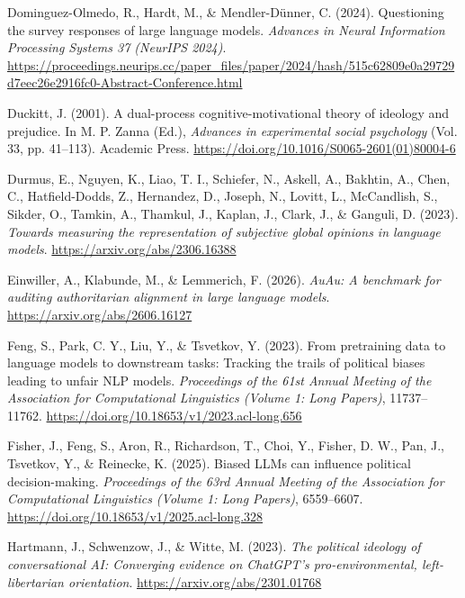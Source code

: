 \documentclass[
]{article}
\newlength{\cslhangindent}
\newenvironment{CSLReferences}[2] %
 {\begin{list}{}{%
  \setlength{\itemindent}{0pt}
  \setlength{\leftmargin}{0pt}
  \setlength{\parsep}{0pt}
  \ifodd #1
   \setlength{\leftmargin}{\cslhangindent}
   \setlength{\itemindent}{-1\cslhangindent}
  \fi
  \setlength{\itemsep}{#2\baselineskip}}}
 {\end{list}}
\begin{document}
\begin{CSLReferences}{1}{0}
Dominguez-Olmedo, R., Hardt, M., \& Mendler-Dünner, C. (2024).
Questioning the survey responses of large language models.
\emph{Advances in Neural Information Processing Systems 37 (NeurIPS
2024)}.
\url{https://proceedings.neurips.cc/paper_files/paper/2024/hash/515c62809e0a29729d7eec26e2916fc0-Abstract-Conference.html}

Duckitt, J. (2001). A dual-process cognitive-motivational theory of
ideology and prejudice. In M. P. Zanna (Ed.), \emph{Advances in
experimental social psychology} (Vol. 33, pp. 41--113). Academic Press.
\url{https://doi.org/10.1016/S0065-2601(01)80004-6}

Durmus, E., Nguyen, K., Liao, T. I., Schiefer, N., Askell, A., Bakhtin,
A., Chen, C., Hatfield-Dodds, Z., Hernandez, D., Joseph, N., Lovitt, L.,
McCandlish, S., Sikder, O., Tamkin, A., Thamkul, J., Kaplan, J., Clark,
J., \& Ganguli, D. (2023). \emph{Towards measuring the representation of
subjective global opinions in language models}.
\url{https://arxiv.org/abs/2306.16388}

Einwiller, A., Klabunde, M., \& Lemmerich, F. (2026). \emph{{AuAu}: A
benchmark for auditing authoritarian alignment in large language
models}. \url{https://arxiv.org/abs/2606.16127}

Feng, S., Park, C. Y., Liu, Y., \& Tsvetkov, Y. (2023). From pretraining
data to language models to downstream tasks: Tracking the trails of
political biases leading to unfair {NLP} models. \emph{Proceedings of
the 61st Annual Meeting of the Association for Computational Linguistics
(Volume 1: Long Papers)}, 11737--11762.
\url{https://doi.org/10.18653/v1/2023.acl-long.656}

Fisher, J., Feng, S., Aron, R., Richardson, T., Choi, Y., Fisher, D. W.,
Pan, J., Tsvetkov, Y., \& Reinecke, K. (2025). Biased {LLMs} can
influence political decision-making. \emph{Proceedings of the 63rd
Annual Meeting of the Association for Computational Linguistics (Volume
1: Long Papers)}, 6559--6607.
\url{https://doi.org/10.18653/v1/2025.acl-long.328}

Hartmann, J., Schwenzow, J., \& Witte, M. (2023). \emph{The political
ideology of conversational {AI}: Converging evidence on {ChatGPT}'s
pro-environmental, left-libertarian orientation}.
\url{https://arxiv.org/abs/2301.01768}


\end{CSLReferences}
\end{document}
